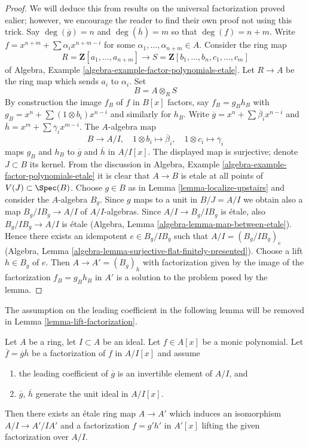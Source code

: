 \begin{proof}
We will deduce this from results on the universal factorization proved
ealier; however, we encourage the reader to find their own proof not
using this trick. Say $\deg(\overline{g}) = n$ and $\deg(\overline{h}) = m$ so
that $\deg(f) = n + m$. Write $f = x^{n + m} + \sum \alpha_i x^{n + m - i}$
for some $\alpha_1, \ldots, \alpha_{n + m} \in A$. Consider the ring map
$$
R = \mathbf{Z}[a_1, \ldots, a_{n + m}]
\longrightarrow
S = \mathbf{Z}[b_1, \ldots, b_n, c_1, \ldots, c_m]
$$
of Algebra, Example \ref{algebra-example-factor-polynomials-etale}.
Let $R \to A$ be the ring map which sends $a_i$ to $\alpha_i$.
Set
$$
B = A \otimes_R S
$$
By construction the image $f_B$ of $f$ in $B[x]$ factors, say
$f_B = g_B h_B$ with $g_B = x^n + \sum (1 \otimes b_i) x^{n - i}$
and similarly for $h_B$.
Write $\overline{g} = x^n + \sum \overline{\beta}_i x^{n - i}$ and
$\overline{h} = x^m + \sum \overline{\gamma}_i x^{m - i}$.
The $A$-algebra map
$$
B \longrightarrow A/I, \quad
1 \otimes b_i \mapsto \overline{\beta}_i, \quad
1 \otimes c_i \mapsto \overline{\gamma}_i
$$
maps $g_B$ and $h_B$ to $\overline{g}$ and $\overline{h}$ in $A/I[x]$.
The displayed map is surjective; denote $J \subset B$ its kernel.
From the discussion in 
Algebra, Example \ref{algebra-example-factor-polynomials-etale}
it is clear that $A \to B$ is etale at all points of $V(J) \subset \Spec(B)$.
Choose $g \in B$ as in Lemma \ref{lemma-localize-upstairs} and
consider the $A$-algebra $B_g$. Since $g$ maps to a unit
in $B/J = A/I$ we obtain also a map $B_g/I B_g \to A/I$ of $A/I$-algebras.
Since $A/I \to B_g/I B_g$ is \'etale, also $B_g/IB_g \to A/I$ is \'etale
(Algebra, Lemma \ref{algebra-lemma-map-between-etale}). Hence there exists an
idempotent $e \in B_g/I B_g$ such that $A/I = (B_g/I B_g)_e$
(Algebra, Lemma \ref{algebra-lemma-surjective-flat-finitely-presented}).
Choose a lift $h \in B_g$ of $e$. Then $A \to A' = (B_g)_h$ with
factorization given by the image of the factorization $f_B = g_B h_B$
in $A'$ is a solution to the problem posed by the lemma.
\end{proof}

\noindent
The assumption on the leading coefficient in the following lemma
will be removed in Lemma \ref{lemma-lift-factorization}.

\begin{lemma}
\label{lemma-lift-factorization-easy}
Let $A$ be a ring, let $I \subset A$ be an ideal. Let $f \in A[x]$ be a
monic polynomial. Let $\overline{f} = \overline{g} \overline{h}$ be a
factorization of $f$ in $A/I[x]$ and assume
\begin{enumerate}
\item the leading coefficient of $\overline{g}$ is an invertible element
of $A/I$, and
\item $\overline{g}$, $\overline{h}$ generate the unit ideal in $A/I[x]$.
\end{enumerate}
Then there exists an \'etale ring map $A \to A'$ which induces an
isomorphism $A/I \to A'/IA'$ and a factorization $f = g' h'$ in $A'[x]$
lifting the given factorization over $A/I$.
\end{lemma}

